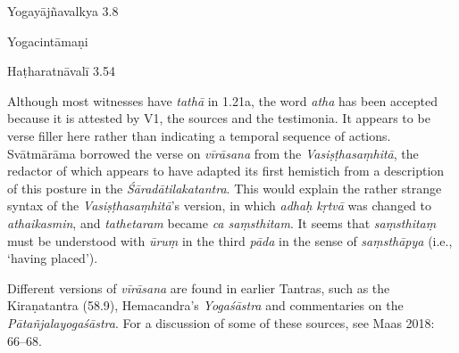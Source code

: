 \begin{ekdosis}
\begin{sources}[hp01_021]
Yogayājñavalkya 3.8

\begin{versinnote}
\end{versinnote}

\end{sources}

\begin{testimonia}[hp01_021]
Yogacintāmaṇi

\begin{versinnote}
\end{versinnote}

Haṭharatnāvalī 3.54

\begin{versinnote}
\end{versinnote}

\end{testimonia}

\begin{philcomm}[hp01_021]   
Although most witnesses have \emph{tathā} in 1.21a, the word \emph{atha} has been accepted because it is attested by V1, the sources and the testimonia. It appears to be verse filler here rather than indicating a temporal sequence of actions. Svātmārāma borrowed the verse on \emph{vīrāsana} from the \emph{Vasiṣṭhasaṃhitā}, the redactor of which appears to have adapted its first hemistich from a description of this posture in the \emph{Śāradātilakatantra}. This would explain the rather strange syntax of the \emph{Vasiṣṭhasaṃhitā}’s version, in which \emph{adhaḥ kṛtvā} was changed to \emph{athaikasmin}, and \emph{tathetaram} became \emph{ca saṃsthitam}. It seems that \emph{saṃsthitaṃ} must be understood with \emph{ūruṃ} in the third \emph{pāda} in the sense of \emph{saṃsthāpya} (i.e., ‘having placed’).

Different versions of \emph{vīrāsana} are found in earlier Tantras, such as the Kiraṇatantra (58.9), Hemacandra’s \emph{Yogaśāstra} and commentaries on the \emph{Pātañjalayogaśāstra}. For a discussion of some of these sources, see Maas 2018: 66–68.
\end{philcomm}


\end{ekdosis}
